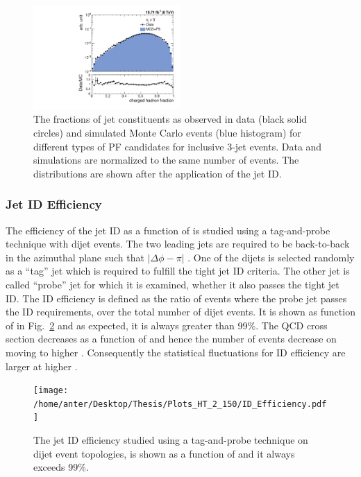 \begin{figure}[!htbp]
\begin{center}
 \includegraphics[width=0.5\textwidth]{Plots_HT_2_150/Comparison_ChHadFrac_3_HT_2_150.pdf}
 \caption{The fractions of jet constituents as observed in data (black solid circles) and simulated Monte Carlo events (blue histogram) for different types of PF candidates for inclusive 3-jet events. Data and simulations are normalized to the same number of events. The distributions are shown after the application of the jet ID.}
 \label{fig:qual3}
 \end{center}
\end{figure} 

\subsubsection{Jet ID Efficiency}
The efficiency of the jet ID as a function of \httwo is studied using a tag-and-probe technique with dijet events. The two leading jets are required to be back-to-back in the azimuthal plane such that $|\Delta\phi - \pi|$ . One of the dijets is selected randomly as a ``tag'' jet which is required to fulfill the tight jet ID criteria. The other jet is called ``probe'' jet for which it is examined, whether it also passes the tight jet ID. The ID efficiency is defined as the ratio of events where the probe jet passes the ID requirements, over the total number of dijet events. It is shown as function of \httwo in Fig.~\ref{fig:ideff} and as expected, it is always greater than 99\%. The QCD cross section decreases as a function of \httwo and hence the number of events decrease on moving to higher \httwons. Consequently the statistical fluctuations for ID efficiency are larger at higher \httwons.

\begin{figure}[!htbp]
 \begin{center}
 \texttt{[image: /home/anter/Desktop/Thesis/Plots\_HT\_2\_150/ID\_Efficiency.pdf]}
 \caption{The jet ID efficiency studied using a tag-and-probe technique on dijet event topologies, is shown as a function of \httwo and it always exceeds 99\%.}
 \label{fig:ideff}
 \end{center}
\end{figure} 

